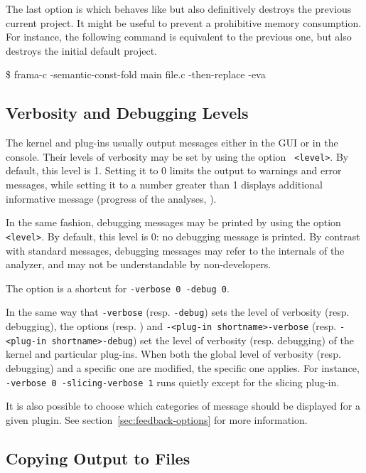 The last option is  which behaves like
 but also definitively destroys the previous current
project. It might be useful to prevent a prohibitive memory consumption. For
instance, the following command is equivalent to the previous one, but also
destroys the initial default project.
\begin{frama-c-commands}
\$ frama-c -semantic-const-fold main file.c -then-replace -eva
\end{frama-c-commands}

\subsection{Verbosity and Debugging Levels}

The \FramaC kernel and plug-ins usually output messages either in the GUI or
in the console. Their levels of verbosity may be set by using the option
\texttt{ <level>}. By default, this level is
1. Setting it to 0 limits the output to warnings and error messages, while setting it
to a number greater than 1 displays additional informative message (progress
of the analyses, \etc).

In the same fashion, debugging messages may be printed by using the option
\texttt{ <level>}. By default, this level is 0: no
debugging message is printed. By contrast with standard messages, debugging
messages may refer to the internals of the analyzer, and may not be
understandable by non-developers.

The option  is a shortcut for \texttt{-verbose 0
  -debug 0}.

In the same way that \texttt{-verbose} (resp. \texttt{-debug}) sets the level
of verbosity (resp. debugging), the options
(resp. ) and
\texttt{-<plug-in shortname>-verbose} (resp. \texttt{-<plug-in shortname>-debug}) set the
level of verbosity (resp. debugging) of the kernel and particular
plug-ins. When both the global level of verbosity (resp. debugging) and a
specific one are modified, the specific one applies. For instance,
\texttt{-verbose 0 -slicing-verbose 1} runs \FramaC quietly except for the
slicing plug-in.

It is also possible to choose which categories of message should be displayed
for a given plugin. See section~\ref{sec:feedback-options} for more information.

\subsection{Copying Output to Files}

